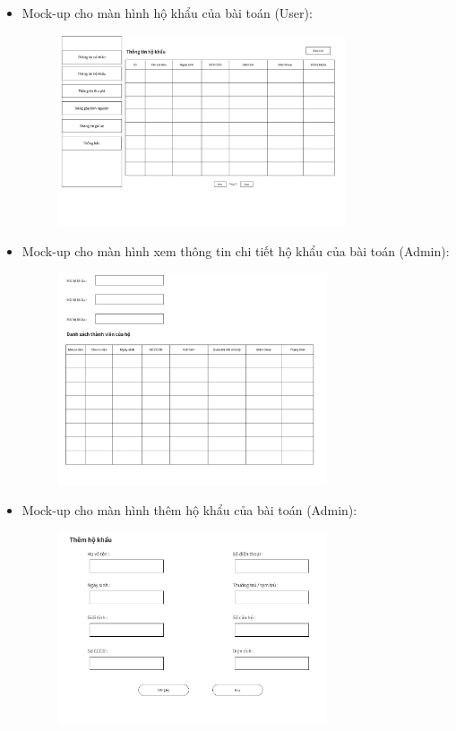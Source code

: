 \documentclass{article}
\begin{document}
\begin{itemize}
\begin{figure}[H]
    \end{figure}
    \item Mock-up cho màn hình hộ khẩu của bài toán (User):
    \begin{figure}[H]
        \centering
        \includegraphics[width=0.8\textwidth]{Ảnh chương 4/Màn hình hộ khẩu (cư dân).png}
    \end{figure}
    \vspace{4cm}
    \item Mock-up cho màn hình xem thông tin chi tiết hộ khẩu của bài toán (Admin):
    \begin{figure}[H]
        \centering
        \includegraphics[width=0.75\textwidth]{Ảnh chương 4/Màn hình thông tin hộ khẩu (admin).png}
    \end{figure}
    \item Mock-up cho màn hình thêm hộ khẩu của bài toán (Admin):
    \begin{figure}[H]
        \centering
        \includegraphics[width=0.75\textwidth]{Ảnh chương 4/Màn hình thêm hộ khẩu.png}

\end{figure}
\end{itemize}
\end{document}
